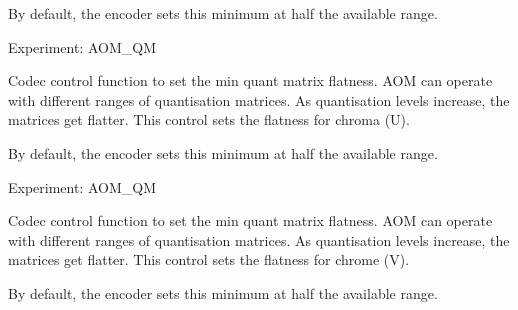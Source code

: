 \begin{Desc}
\begin{description}
By default, the encoder sets this minimum at half the available range.

Experiment\+: A\+O\+M\+\_\+\+QM \item[{\em 
A\+V1\+E\+\_\+\+S\+E\+T\+\_\+\+Q\+M\+\_\+U\hypertarget{group__aom__encoder_ggae78dde67a6d78f332e9bdba0dde42db5a5afff92787c68c2b5c50e3cfb9938504}{}\label{group__aom__encoder_ggae78dde67a6d78f332e9bdba0dde42db5a5afff92787c68c2b5c50e3cfb9938504}
}]Codec control function to set the min quant matrix flatness. A\+OM can operate with different ranges of quantisation matrices. As quantisation levels increase, the matrices get flatter. This control sets the flatness for chroma (U).

By default, the encoder sets this minimum at half the available range.

Experiment\+: A\+O\+M\+\_\+\+QM \item[{\em 
A\+V1\+E\+\_\+\+S\+E\+T\+\_\+\+Q\+M\+\_\+V\hypertarget{group__aom__encoder_ggae78dde67a6d78f332e9bdba0dde42db5a458d60628603d6c1c670d7d051634864}{}\label{group__aom__encoder_ggae78dde67a6d78f332e9bdba0dde42db5a458d60628603d6c1c670d7d051634864}
}]Codec control function to set the min quant matrix flatness. A\+OM can operate with different ranges of quantisation matrices. As quantisation levels increase, the matrices get flatter. This control sets the flatness for chrome (V).

By default, the encoder sets this minimum at half the available range.


\end{description}
\end{Desc}

